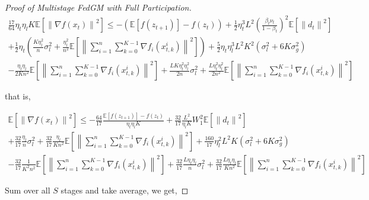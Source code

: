 \begin{proof}[Proof of Multistage FedGM with Full Participation]
\begin{equation}
\begin{gathered}
\frac{17}{64}\eta_t \eta_l K \mathbb{E}\left[\left\|\nabla f(x_t)\right\|^2\right] \leq -\left(\mathbb{E}[f(z_{t+1})] - f(z_t)\right) + \frac{1}{2}\eta_t^3L^2\left(\frac{\beta_t\nu_t}{1-\beta_t}\right)^2\mathbb{E}\left[\left\| d_t\right\|^2\right] \\
+ \frac{1}{2}\eta_t \left(\frac{K\eta_l^2}{n} \sigma^2_l+\frac{\eta_l^2}{n^2}\mathbb{E}\left[\left\| \sum_{i=1}^n\sum_{k=0}^{K-1}  \nabla f_i(x_{t,k}^i) \right\|^2\right]\right)+\frac{5}{2}\eta_t\eta_l^3L^2K^2\left(\sigma_l^2+6K\sigma_g^2\right) \\
-\frac{\eta_t\eta_l}{2Kn^2} \mathbb{E}\left[\left\| \sum_{i=1}^n\sum_{k=0}^{K-1} \nabla f_i(x_{t,k}^i)\right\|^2\right] +\frac{L K \eta_t^2 \eta_l^2 }{2n}\sigma_l^2 + \frac{L\eta_t^2 \eta_l^2}{2n^2}\mathbb{E}\left[\left\| \sum_{i=1}^n\sum_{k=0}^{K-1}  \nabla f_i(x_{t,k}^i) \right\|^2\right]
\end{gathered}\nonumber
\end{equation}

that is,

\begin{equation}
\begin{gathered}
\mathbb{E}\left[\left\|\nabla f(x_t)\right\|^2\right] \leq -\frac{64}{17}\frac{\mathbb{E}\left[f(z_{t+1})\right] - f(z_t)}{\eta_t \eta_l K} + \frac{32}{17}\frac{L^2}{\eta_l K}W_1^2\mathbb{E}\left[\left\| d_t\right\|^2\right] \\
+ \frac{32}{17}\frac{\eta_l}{n}\sigma_l^2 +\frac{32}{17} \frac{\eta_l}{Kn^2}\mathbb{E}\left[\left\| \sum_{i=1}^n\sum_{k=0}^{K-1}  \nabla f_i(x_{t,k}^i) \right\|^2\right] +\frac{160}{17} \eta_l^2L^2K \left(\sigma_l^2+6K\sigma_g^2\right) \\
-\frac{32}{17}\frac{1}{K^2n^2} \mathbb{E}\left[\left\| \sum_{i=1}^n\sum_{k=0}^{K-1} \nabla f_i(x_{t,k}^i)\right\|^2\right] + \frac{32}{17} \frac{L \eta_t \eta_l }{n}\sigma_l^2 +\frac{32}{17} \frac{L\eta_t  \eta_l }{K n^2}\mathbb{E}\left[\left\| \sum_{i=1}^n\sum_{k=0}^{K-1}  \nabla f_i(x_{t,k}^i) \right\|^2\right]
\end{gathered}\nonumber
\end{equation}

\iffalse

Sum over all $S$ stages and take average, we get,


\end{proof}
